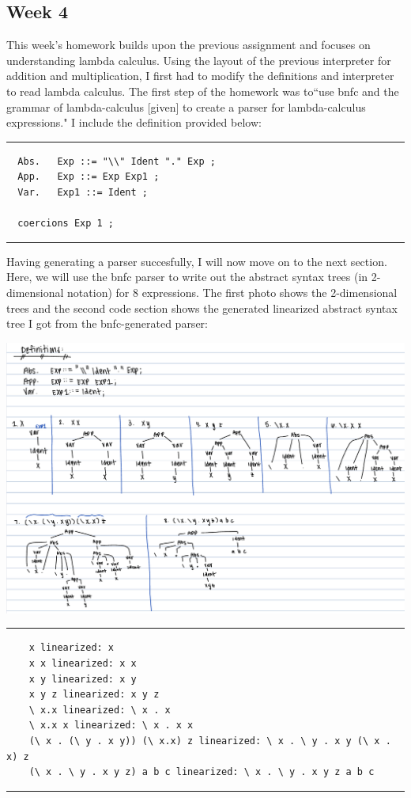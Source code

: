 \documentclass{article}
\theoremstyle{theorem}
\theoremstyle{definition}
\theoremstyle{remark}
\begin{document}
\subsection{Week 4}
This week's homework builds upon the previous assignment and focuses on understanding lambda calculus. Using the layout of the previous interpreter for addition and multiplication, I first had to 
modify the definitions and interpreter to read lambda calculus. The first step of the homework was to``use bnfc and the grammar of lambda-calculus [given] to create a parser for lambda-calculus expressions." 
I include the definition provided below: \\
\noindent
{\color{gray} \rule{\linewidth}{0.05mm}}
\begin{verbatim}
  Abs.   Exp ::= "\\" Ident "." Exp ;  
  App.   Exp ::= Exp Exp1 ; 
  Var.   Exp1 ::= Ident ;

  coercions Exp 1 ;
\end{verbatim}
\noindent
{\color{gray} \rule{\linewidth}{0.05mm}}


Having generating a parser succesfully, I will now move on to the next section. Here, we will use the bnfc parser to write out the abstract syntax trees (in 2-dimensional notation) for 8 expressions. The first photo 
shows the 2-dimensional trees and the second code section shows the generated linearized abstract syntax tree I got from the bnfc-generated parser: 
\begin{center}
  \includegraphics[width=15cm]{Week4hw_Trees.jpg}

  \noindent
  {\color{gray} \rule{\linewidth}{0.05mm}}

  \begin{verbatim}
    x linearized: x
    x x linearized: x x
    x y linearized: x y
    x y z linearized: x y z
    \ x.x linearized: \ x . x
    \ x.x x linearized: \ x . x x
    (\ x . (\ y . x y)) (\ x.x) z linearized: \ x . \ y . x y (\ x . x) z
    (\ x . \ y . x y z) a b c linearized: \ x . \ y . x y z a b c
  \end{verbatim}

  \noindent
  {\color{gray} \rule{\linewidth}{0.05mm}}
\end{center}
\end{document}
